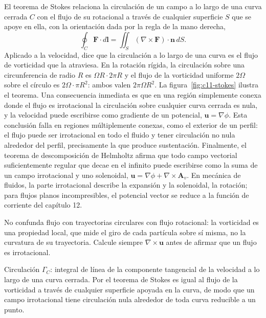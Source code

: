 \documentclass[10pt,openany]{book}
\begin{document}
El teorema de Stokes relaciona la circulación de un campo a lo largo de una curva cerrada \(C\) con el flujo de su rotacional a través de cualquier superficie \(S\) que se apoye en ella, con la orientación dada por la regla de la mano derecha,
\begin{equation}
\oint_C \mathbf{F}\cdot d\mathbf{l} = \iint_S (\nabla\times\mathbf{F})\cdot\mathbf{n}\,dS. \label{eq:c11-stokes}
\end{equation}
Aplicado a la velocidad, dice que la circulación a lo largo de una curva es el flujo de vorticidad que la atraviesa. En la rotación rígida, la circulación sobre una circunferencia de radio \(R\) es \(\Omega R\cdot 2\pi R\) y el flujo de la vorticidad uniforme \(2\Omega\) sobre el círculo es \(2\Omega\cdot\pi R^{2}\): ambos valen \(2\pi\Omega R^{2}\). La figura~\ref{fig:c11-stokes} ilustra el teorema. Una consecuencia inmediata es que en una región simplemente conexa donde el flujo es irrotacional la circulación sobre cualquier curva cerrada es nula, y la velocidad puede escribirse como gradiente de un potencial, \(\mathbf{u} = \nabla\phi\). Esta conclusión falla en regiones múltiplemente conexas, como el exterior de un perfil: el flujo puede ser irrotacional en todo el fluido y tener circulación no nula alrededor del perfil, precisamente la que produce sustentación. Finalmente, el teorema de descomposición de Helmholtz afirma que todo campo vectorial suficientemente regular que decae en el infinito puede escribirse como la suma de un campo irrotacional y uno solenoidal, \(\mathbf{u} = \nabla\phi + \nabla\times\mathbf{A}_v\). En mecánica de fluidos, la parte irrotacional describe la expansión y la solenoidal, la rotación; para flujos planos incompresibles, el potencial vector se reduce a la función de corriente del capítulo 12.

\begin{tcolorbox}[title={Consejo}, studiumtip, breakable]

No confunda flujo con trayectorias circulares con flujo rotacional: la vorticidad es una propiedad local, que mide el giro de cada partícula sobre sí misma, no la curvatura de su trayectoria. Calcule siempre \(\nabla\times\mathbf{u}\) antes de afirmar que un flujo es irrotacional.
\end{tcolorbox}

\begin{tcolorbox}[title={Definición}, studiumdef, breakable]

Circulación \(\Gamma_C\): integral de línea de la componente tangencial de la velocidad a lo largo de una curva cerrada. Por el teorema de Stokes es igual al flujo de la vorticidad a través de cualquier superficie apoyada en la curva, de modo que un campo irrotacional tiene circulación nula alrededor de toda curva reducible a un punto.
\end{tcolorbox}
\end{document}
